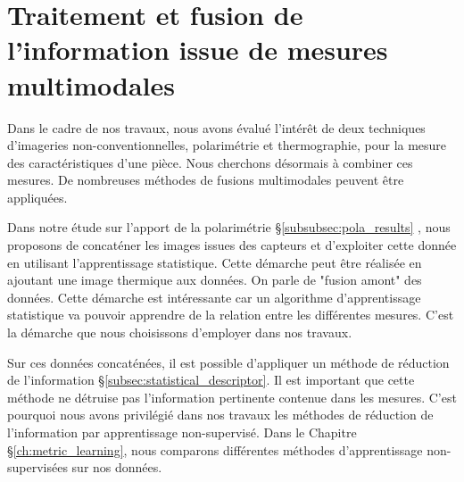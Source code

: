\bigskip

\bigskip

\newpage

\section{Traitement et fusion de l'information issue de mesures multimodales} \label{sec:multimodal}
Dans le cadre de nos travaux, nous avons évalué l'intérêt de deux techniques d'imageries non-conventionnelles, polarimétrie et thermographie, pour la mesure des caractéristiques d'une pièce.
Nous cherchons désormais à combiner ces mesures.
De nombreuses méthodes de fusions multimodales peuvent être appliquées.

Dans notre étude sur l'apport de la polarimétrie §\ref{subsubsec:pola_results} \cite{nagorny_polarimetric_2019}, nous proposons de concaténer les images issues des capteurs et d'exploiter cette donnée en utilisant l'apprentissage statistique.
Cette démarche peut être réalisée en ajoutant une image thermique aux données.
On parle de "fusion amont" des données.
Cette démarche est intéressante car un algorithme d'apprentissage statistique va pouvoir apprendre de la relation entre les différentes mesures.
C'est la démarche que nous choisissons d'employer dans nos travaux.

Sur ces données concaténées, il est possible d'appliquer un méthode de réduction de l'information §\ref{subsec:statistical_descriptor}.
Il est important que cette méthode ne détruise pas l'information pertinente contenue dans les mesures.
C'est pourquoi nous avons privilégié dans nos travaux les méthodes de réduction de l'information par apprentissage non-supervisé.
Dans le Chapitre §\ref{ch:metric_learning}, nous comparons différentes méthodes d'apprentissage non-supervisées sur nos données.

